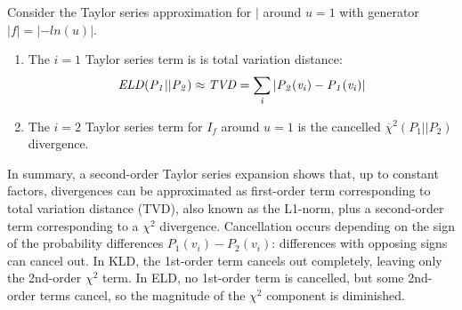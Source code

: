 {\begin{proposition} Consider the Taylor series approximation for  $\mid$ around $u=1$ with generator $|f|=|-ln(u)|$. 
\begin{enumerate}
\item The $i=1$ Taylor series term is is total variation distance:
$$\it{ELD}(P_{1}||P_{2}) \approx  TVD =  \sum_{i} |P_{2}(v_{i})-P_{1}(v_{i})|$$
\item The $i=2$ Taylor series term for  $I_{f}$ around $u=1$ is the cancelled $\overline{\chi}^2(P_{1}||P_{2})$ divergence.
\end{enumerate}
\end{proposition}

In summary, a second-order Taylor series expansion shows that, up to constant factors, divergences can be approximated as first-order term corresponding to total variation distance (TVD), also known as the L1-norm, plus a second-order term corresponding to a $\chi^{2}$ divergence. Cancellation occurs depending on the sign of the probability differences $P_1(v_i) - P_2(v_i)$: differences with opposing signs can cancel out. In KLD, the 1st-order term cancels out completely, leaving only the 2nd-order $\chi^{2}$ term. In ELD, no 1st-order term is cancelled, but some 2nd-order terms cancel, so the magnitude of the $\chi^{2}$ component is diminished. 


%
%
%




}
